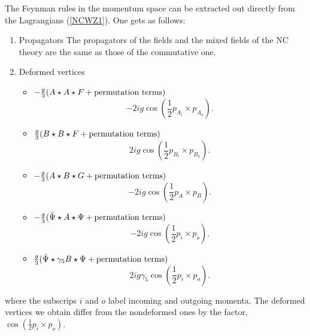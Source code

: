 \documentclass[a4paper,a4paper]{article}
\begin{document}
The Feynman rules in the momentum space can be extracted 
out directly from the Lagrangians (\ref{NCWZ1}). One gets as follows:
\begin{enumerate}
\item Propagators\newline 
The propagators of the fields and the mixed fields of the NC theory are 
the same as those of the commutative one.  
\item Deformed vertices
\begin{itemize}
\item  $-\frac g3(A\star A\star F + \hbox{permutation terms})$
$$-2ig\cos(\frac 12 p_{A_i}\times p_{A_o}).$$
\item  $\frac g3(B\star B\star F + \hbox{permutation terms})$
$$2ig\cos(\frac 12 p_{B_i}\times p_{B_o}).$$
\item $-\frac g3(A\star B\star G + \hbox{permutation terms})$
$$-2ig\cos(\frac 12 p_{A}\times p_{B}).$$
\item $-\frac g3(\bar{\Psi}\star A\star \Psi + \hbox{permutation terms})$
$$-2ig\cos(\frac 12 p_i\times p_o).$$
\item $\frac g3(\bar{\Psi}\star\gamma_5 B\star \Psi + \hbox{permutation terms})$
$$2ig\gamma_5\cos(\frac 12 p_i\times p_o).$$
\end{itemize}
\end{enumerate}
where the subscrips $i$ and $o$ label incoming and outgoing momenta.
The deformed vertices we obtain differ from the nondeformed ones by the factor, 
$\cos(\frac 12 p_i\times p_o)$. 
\end{document}
